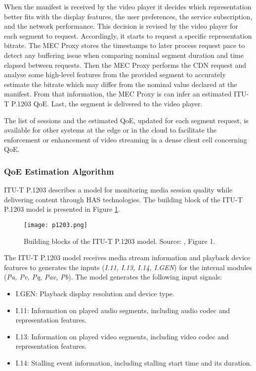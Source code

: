 When the manifest is received by the video player it decides which representation better fits with the display features, the user preferences, the service subscription, and the network performance. This decision is revised by the video player for each segment to request. Accordingly, it starts to request a specific representation bitrate. The MEC Proxy stores the timestamps to later process request pace to detect any buffering issue when comparing nominal segment duration and time elapsed between requests. Then the MEC Proxy performs the CDN request and analyse some high-level features from the provided segment to accurately estimate the bitrate which may differ from the nominal value declared at the manifest. From that information, the MEC Proxy is can infer an estimated ITU-T P.1203 QoE. Last, the segment is delivered to the video player.

The list of sessions and the estimated QoE, updated for each segment request, is available for other systems at the edge or in the cloud to facilitate the enforcement or enhancement of video streaming in a dense client cell concerning QoE.


\subsubsection{QoE Estimation Algorithm}
\label{sec:MTAP202032}

ITU-T P.1203 \cite{itup1203} describes a model for monitoring media session quality while delivering content through HAS technologies. The building block of the ITU-T P.1203 model is presented in Figure \ref{fig:MTAP2020model}.

\begin{figure}[htp]
	\centering
	\texttt{[image: p1203.png]}
	\caption{Building blocks of the ITU-T P.1203 model. Source: \cite{itup1203}, Figure 1.}
	\label{fig:MTAP2020model} %
\end{figure}

The ITU-T P.1203 model receives media stream information and playback device features to generates the inputs (\textit{I.11, I.13, I.14, I.GEN}) for the internal modules (\textit{Pa, Pv, Pq, Pav, Pb}). The model generates the following input signals:

\begin{itemize}
	\item I.GEN: Playback display resolution and device type.
	\item I.11: Information on played audio segments, including audio codec and representation features.
	\item I.13: Information on played video segments, including video codec and representation features.
	\item I.14: Stalling event information, including stalling start time and its duration.
\end{itemize}

